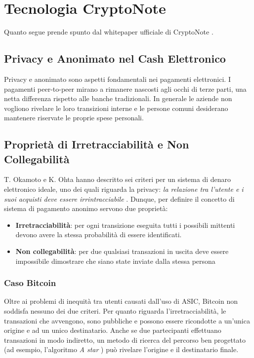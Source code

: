 \section{Tecnologia CryptoNote}\label{aspetti-tecnici-di-cryptonote}
Quanto segue prende spunto dal whitepaper ufficiale di CryptoNote \cite{cryptonotev2}.


\subsection{Privacy e Anonimato nel Cash Elettronico}\label{privacy-e-anonimato-nel-cash-elettronico}
Privacy e anonimato sono aspetti fondamentali nei pagamenti elettronici. I
pagamenti peer-to-peer mirano a rimanere nascosti agli occhi di terze
parti, una netta differenza rispetto alle banche tradizionali. In
generale le aziende non vogliono rivelare le loro transizioni interne e
le persone comuni desiderano mantenere riservate le proprie spese
personali.

\subsection{Proprietà di Irretracciabilità e Non Collegabilità}\label{proprieta-di-irretracciabilita-e-non-collegabilita}
T. Okamoto e K. Ohta hanno descritto sei criteri per un sistema di
denaro elettronico ideale, uno dei quali riguarda la privacy: \textit{la
relazione tra l'utente e i suoi acquisti deve essere irrintracciabile}
\cite{okamoto1991universal}. Dunque, per definire il concetto di sistema di pagamento
anonimo servono due proprietà:

\begin{itemize}
\item
  \textbf{Irretracciabilità}: per ogni transizione eseguita tutti i possibili
  mittenti devono avere la stessa probabilità di essere identificati.
\item
  \textbf{Non collegabilità}: per due qualsiasi transazioni in uscita deve essere
  impossibile dimostrare che siano state inviate dalla stessa persona
\end{itemize}


\subsubsection{Caso Bitcoin}\label{limiti-di-bitcoin}
Oltre ai problemi di inequità tra utenti causati dall'uso di ASIC, Bitcoin non soddisfa nessuno dei due criteri.
Per quanto riguarda l'irretracciabilità, le transazioni che avvengono, sono pubbliche e possono essere ricondotte a
un'unica origine e ad un unico destinatario.
Anche se due partecipanti effettuano transazioni in modo indiretto, un
metodo di ricerca del percorso ben progettato (ad esempio, l'algoritmo
\textit{A star} \cite{hart1968formal}) può rivelare l'origine e il destinatario
finale.

